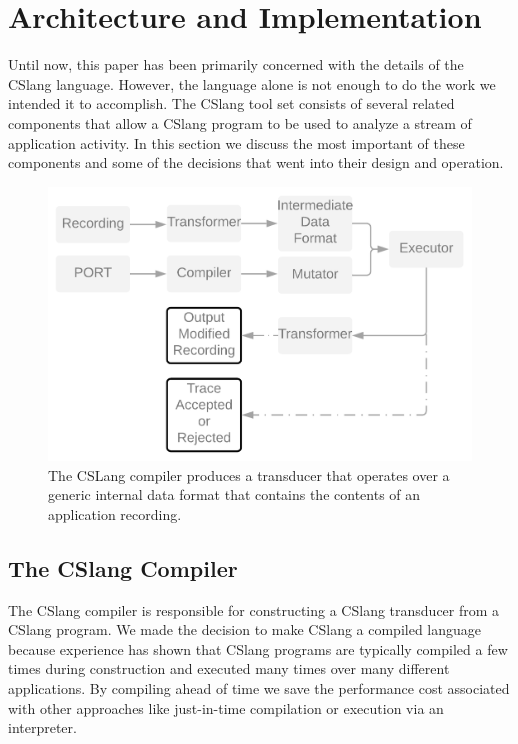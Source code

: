 \section{Architecture and Implementation}

Until now, this paper has been primarily concerned with the details of the
CSlang language.  However, the language alone is not enough to do the work
we intended it to accomplish.  The CSlang tool set
consists of several related
components that allow a CSlang program to be used to analyze a stream of
application activity.
In this section we discuss the most important of these components and some
of the decisions that went into their design and operation.

\label{SEC:architecture}

\begin{figure}
  \includegraphics[scale=.08]{images/architecture}
  \caption{The CSLang compiler produces a transducer that operates over a
  generic internal data format that contains the contents of an application
  recording.}
  \label{fig:architecture}
\end{figure}

\subsection{The CSlang Compiler}

The CSlang compiler is responsible for constructing a CSlang transducer
from a CSlang program.
We made the decision to make CSlang a compiled language because
experience has shown that CSlang programs are typically
compiled a few times during construction
and executed many times over many different applications.
By compiling ahead of time we save the performance cost associated with other
approaches like just-in-time compilation or execution via an interpreter.

